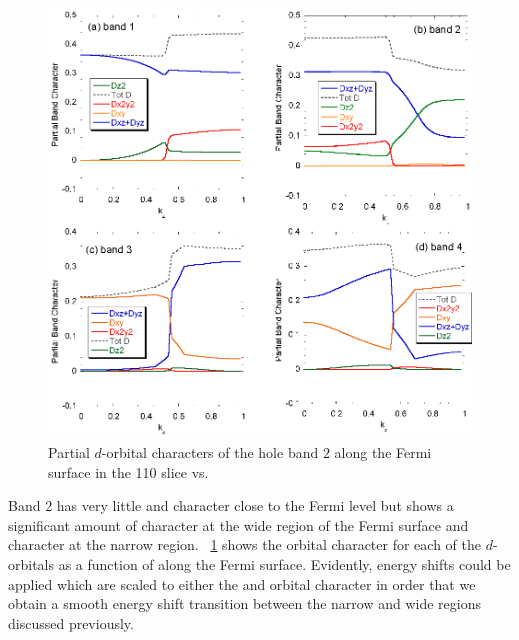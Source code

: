 {{{\begin{figure}[h!]
\begin{center}
        \includegraphics[scale=0.9]{Chapter3-dHvABaFe2P2/Figures/AngleDepMeasurements/BandCharacterVsKz/BandCharacterVsKz}
        \caption{Partial $d$-orbital characters of the hole band $2$ along the Fermi surface in the 110 slice vs. \kz}
        \label{Fig:3:Band2DCharacterVsKz}
    \end{center}
\end{figure}

Band $2$ has very little \Dxy and \DxTwoyTwo character close to the Fermi level but shows a significant amount of \DzTwo character at the wide region of the Fermi surface and \DxzDyz character at the narrow region. \Fig~\ref{Fig:3:Band2DCharacterVsKz} shows the orbital character for each of the $d$-orbitals as a function of \kz along the Fermi surface. Evidently, energy shifts could be applied which are scaled to either the \DzTwo and \DxzDyz orbital character in order that we obtain a smooth energy shift transition between the narrow and wide regions discussed previously.

}}}
